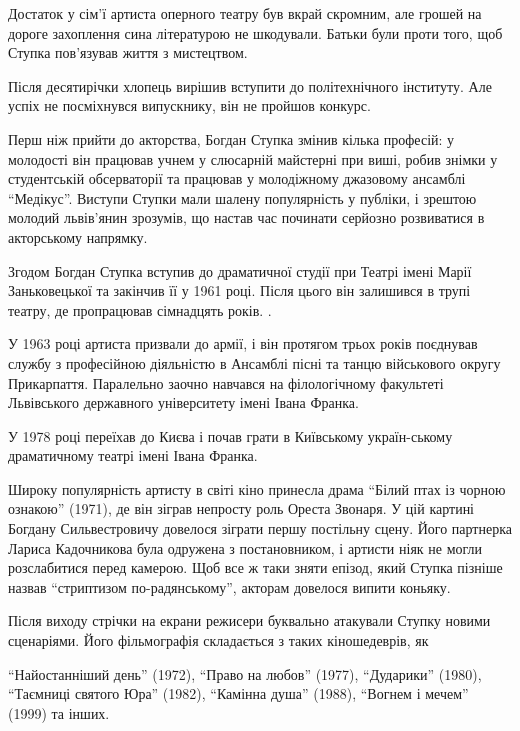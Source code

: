 Достаток у сім'ї артиста оперного театру був вкрай скромним, але грошей на
дороге захоплення сина літературою не шкодували. Батьки були проти того, щоб
Ступка пов'язував життя з мистецтвом.

Після десятирічки хлопець вирішив вступити до політехнічного інституту. Але
успіх не посміхнувся випускнику, він не пройшов конкурс.

Перш ніж прийти до акторства, Богдан Ступка змінив кілька професій: у молодості
він працював учнем у слюсарній майстерні при виші, робив знімки у студентській
обсерваторії та працював у молодіжному джазовому ансамблі \enquote{Медікус}. Виступи
Ступки мали шалену популярність у публіки, і зрештою молодий львів'янин
зрозумів, що настав час починати серйозно розвиватися в акторському напрямку.


Згодом Богдан Ступка вступив до драматичної студії при Театрі імені Марії
Заньковецької та закінчив її у 1961 році. Після цього він залишився в трупі
театру, де пропрацював сімнадцять років. .

У 1963 році артиста призвали до армії, і він протягом трьох років поєднував
службу з професійною діяльністю в Ансамблі пісні та танцю військового округу
Прикарпаття. Паралельно заочно навчався на філологічному факультеті Львівського
державного університету імені Івана Франка.

У 1978 році переїхав до Києва і почав грати в Київському україн\hyp{}ському
драматичному театрі імені Івана Франка.

Широку популярність артисту в світі кіно принесла драма \enquote{Білий птах із чорною
ознакою} (1971), де він зіграв непросту роль Ореста Звонаря. У цій картині
Богдану Сильвестровичу довелося зіграти першу постільну сцену. Його партнерка
Лариса Кадочникова була одружена з постановником, і артисти ніяк не могли
розслабитися перед камерою. Щоб все ж таки зняти епізод, який Ступка пізніше
назвав \enquote{стриптизом по-радянському}, акторам довелося випити коньяку.

Після виходу стрічки на екрани режисери буквально атакували Ступку новими
сценаріями. Його фільмографія складається з таких кіношедеврів, як

\enquote{Найостанніший день} (1972), \enquote{Право на любов} (1977), \enquote{Дударики} (1980),
\enquote{Таємниці святого Юра} (1982), \enquote{Камінна душа} (1988), \enquote{Вогнем і мечем} (1999)
та інших.

